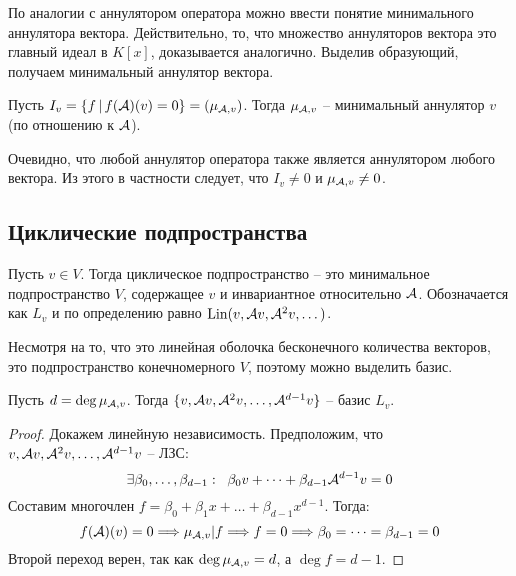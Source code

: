 {По аналогии с аннулятором оператора можно ввести понятие минимального аннулятора вектора.
Действительно, то, что множество аннуляторов вектора это главный идеал в $K[x]$, доказывается аналогично.
Выделив образующий, получаем минимальный аннулятор вектора.

\begin{conj}
    Пусть $I_v = \{ f \, | \, f(\mathcal{A}) (v) = 0 \} = (\mu_{\mathcal{A}, v})$.
    Тогда $\mu_{\mathcal{A}, v}$ -- минимальный аннулятор $v$ (по отношению к $\mathcal{A}$).
\end{conj}

Очевидно, что любой аннулятор оператора также является аннулятором любого вектора.
Из этого в частности следует, что $I_v \neq 0$ и $\mu_{\mathcal{A}, v} \neq 0$. 

\subsection{Циклические подпространства}

\begin{conj}
    Пусть $v \in V$.
    Тогда циклическое подпространство -- это минимальное подпространство $V$, содержащее $v$ и инвариантное относительно $\mathcal{A}$.
    Обозначается как $L_v$ и по определению равно $\operatorname{Lin} (v, \mathcal{A} v, \mathcal{A}^2 v, \dots)$.
\end{conj}

\vspace*{3mm}

Несмотря на то, что это линейная оболочка бесконечного количества векторов, это подпространство конечномерного $V$, поэтому можно выделить базис.

\vspace*{2mm}

\begin{theorem}
    Пусть $d = \deg \mu_{\mathcal{A}, v}$.
    Тогда $\{ v, \mathcal{A} v, \mathcal{A}^2 v, \dots, \mathcal{A}^{d - 1} v \}$ -- базис $L_v$.
\end{theorem}

\begin{proof}
    Докажем линейную независимость.
    Предположим, что $v, \mathcal{A} v, \mathcal{A}^2 v, \dots, \mathcal{A}^{d - 1} v $ -- ЛЗС:
    \[ \exists \beta_0, \dots, \beta_{d-1} : \;\; \beta_0 v + \dots + \beta_{d - 1} \mathcal{A}^{d - 1} v = 0 \]
    \quad Составим многочлен $f = \beta_0 + \beta_1 x + \dots + \beta_{d - 1} x^{d - 1}$. 
    Тогда: \[ f(\mathcal{A})(v) = 0 \Longrightarrow \mu_{\mathcal{A}, v} | f \Longrightarrow f = 0 \Longrightarrow \beta_0 = \dots = \beta_{d - 1} = 0 \]
    \quad Второй переход верен, так как $\deg \mu_{\mathcal{A}, v} = d$, а $\deg f = d - 1$.
    

\end{proof}}
